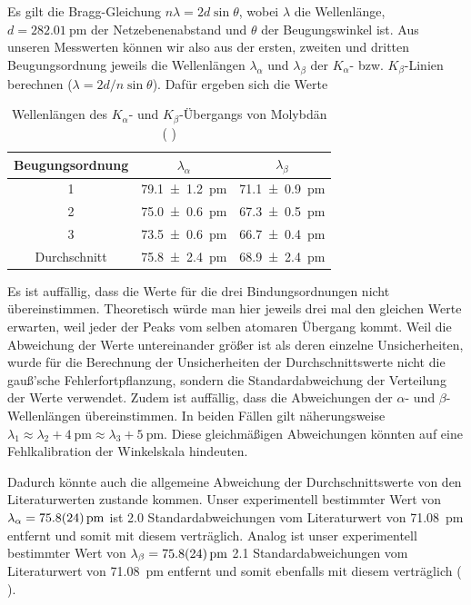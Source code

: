 \documentclass{article}
\newcommand{\coderef}[1]{%
    \text{\footnotesize \colorbox{codebg}{\texttt{#1()}}}%
}
\begin{document}
Es gilt die Bragg-Gleichung $n \lambda = 2 d \sin \theta$,
wobei $\lambda$ die Wellenlänge, $d = \qty{282.01}{\pico\meter}$ der
Netzebenenabstand und $\theta$ der Beugungswinkel ist.
Aus unseren Messwerten können wir also aus der ersten, zweiten und dritten
Beugungsordnung jeweils die Wellenlängen $\lambda_\alpha$ und $\lambda_\beta$
der $K_\alpha$- bzw. $K_\beta$-Linien berechnen ($\lambda = 2 d / n \sin \theta$).
Dafür ergeben sich die Werte
\begin{table}[H]
    \centering
    \begin{tabular}{c|c|c}
        Beugungsordnung & $\lambda_\alpha$ & $\lambda_\beta$ \\
        \hline
        1 & \qty{79.1 \pm 1.2}{\pico\meter} & \qty{71.1 \pm 0.9}{\pico\meter} \\
        2 & \qty{75.0 \pm 0.6}{\pico\meter} & \qty{67.3 \pm 0.5}{\pico\meter} \\
        3 & \qty{73.5 \pm 0.6}{\pico\meter} & \qty{66.7 \pm 0.4}{\pico\meter} \\
        \hline
        Durchschnitt & \qty{75.8 \pm 2.4}{\pico\meter} & \qty{68.9 \pm 2.4}{\pico\meter}
    \end{tabular}
    \caption{Wellenlängen des $K_\alpha$- und $K_\beta$-Übergangs von Molybdän
    (\coderef{tv1})}
\end{table}
Es ist auffällig, dass die Werte für die drei Bindungsordnungen nicht übereinstimmen.
Theoretisch würde man hier jeweils drei mal den gleichen Werte erwarten,
weil jeder der Peaks vom selben atomaren Übergang kommt.
Weil die Abweichung der Werte untereinander größer ist als deren einzelne
Unsicherheiten, wurde für die Berechnung der Unsicherheiten der
Durchschnittswerte nicht die gauß'sche Fehlerfortpflanzung,
sondern die Standardabweichung der Verteilung der Werte verwendet.
Zudem ist auffällig, dass die Abweichungen der $\alpha$- und $\beta$-Wellenlängen
übereinstimmen. In beiden Fällen gilt näherungsweise
$\lambda_1 \approx \lambda_2 + \qty{4}{\pm} \approx \lambda_3 + \qty{5}{\pm}$.
Diese gleichmäßigen Abweichungen könnten auf eine Fehlkalibration
der Winkelskala hindeuten.

Dadurch könnte auch die allgemeine Abweichung der
Durchschnittswerte von den Literaturwerten zustande kommen.
Unser experimentell bestimmter Wert von $\lambda_\alpha = \qty{75.8 \pm 2.4}{\pm}$
ist \num{2.0} Standardabweichungen vom Literaturwert von \qty{71.08}{\pm}
entfernt und somit mit diesem verträglich.
Analog ist unser experimentell bestimmter Wert von
$\lambda_\beta = \qty{75.8 \pm 2.4}{\pm}$ \num{2.1} Standardabweichungen vom
Literaturwert von \qty{71.08}{\pm} entfernt und somit ebenfalls mit
diesem verträglich (\coderef{tv1}).
\end{document}
